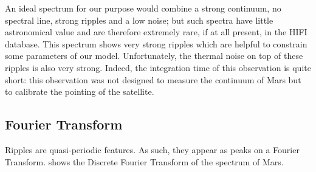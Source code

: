 An ideal spectrum for our purpose would combine a strong continuum, no spectral line, strong ripples and a low noise; but such spectra have little astronomical value and are therefore extremely rare, if at all present, in the HIFI database.
This spectrum shows very strong ripples which are helpful to constrain some parameters of our model.
Unfortunately, the thermal noise on top of these ripples is also very strong.
Indeed, the integration time of this observation is quite short: this observation was not designed to measure the continuum of Mars but to calibrate the pointing of the satellite.





\subsection{Fourier Transform}
Ripples are quasi-periodic features.
As such, they appear as peaks on a Fourier Transform.
 shows the Discrete Fourier Transform of the spectrum of Mars.

